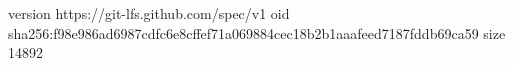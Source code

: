 version https://git-lfs.github.com/spec/v1
oid sha256:f98e986ad6987cdfc6e8cffef71a069884cec18b2b1aaafeed7187fddb69ca59
size 14892
